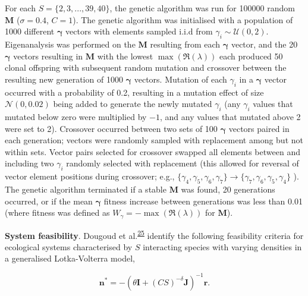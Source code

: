 \documentclass[]{article}
\begin{document}
For each \(S = \{2, 3, ..., 39, 40\}\), the genetic algorithm was run
for 100000 random \(\mathbf{M}\) (\(\sigma = 0.4\), \(C = 1\)). The
genetic algorithm was initialised with a population of 1000 different
\(\mathbf{\gamma}\) vectors with elements sampled i.i.d from
\(\gamma_{i} \sim \mathcal{U}(0, 2)\). Eigenanalysis was performed on
the \(\mathbf{M}\) resulting from each \(\mathbf{\gamma}\) vector, and
the 20 \(\mathbf{\gamma}\) vectors resulting in \(\mathbf{M}\) with the
lowest \(\max\left(\Re(\lambda)\right)\) each produced 50 clonal
offspring with subsequent random mutation and crossover between the
resulting new generation of 1000 \(\mathbf{\gamma}\) vectors. Mutation
of each \(\gamma_{i}\) in a \(\mathbf{\gamma}\) vector occurred with a
probability of 0.2, resulting in a mutation effect of size
\(\mathcal{N}(0, 0.02)\) being added to generate the newly mutated
\(\gamma_{i}\) (any \(\gamma_{i}\) values that mutated below zero were
multiplied by \(-1\), and any values that mutated above 2 were set to
2). Crossover occurred between two sets of 100 \(\mathbf{\gamma}\)
vectors paired in each generation; vectors were randomly sampled with
replacement among but not within sets. Vector pairs selected for
crossover swapped all elements between and including two \(\gamma_{i}\)
randomly selected with replacement (this allowed for reversal of vector
element positions during crossover; e.g.,
\(\{\gamma_{4}, \gamma_{5}, \gamma_{6}, \gamma_{7}\} \to \{\gamma_{7}, \gamma_{6}, \gamma_{5}, \gamma_{4}\}\)
). The genetic algorithm terminated if a stable \(\mathbf{M}\) was
found, 20 generations occurred, or if the mean \(\mathbf{\gamma}\)
fitness increase between generations was less than 0.01 (where fitness
was defined as \(W_{\gamma} = -\max\left(\Re(\lambda)\right)\) for
\(\mathbf{M}\)).

\textbf{System feasibility}. Dougoud et
al.\textsuperscript{\protect\hyperlink{ref-Dougoud2018}{25}} identify
the following feasibility criteria for ecological systems characterised
by \(S\) interacting species with varying densities in a generalised
Lotka-Volterra model,

\[\mathbf{n^{*}} = -\left(\theta \mathbf{I} + (CS)^{-\delta}\mathbf{J} \right)^{-1}\mathbf{r}.\]
\end{document}
